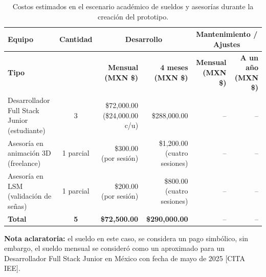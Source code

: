 \begin{table}[H]
	\centering
	\renewcommand{\arraystretch}{1.6}
	\setlength{\tabcolsep}{10pt}
	\Huge
	\begin{adjustbox}{max width=\textwidth}
		\begin{tabular}{|p{5.5cm}|c|r|r|r|r|}
			\hline
			\textbf{Equipo} & \textbf{Cantidad} & \multicolumn{2}{c|}{\textbf{Desarrollo}} & \multicolumn{2}{c|}{\textbf{Mantenimiento / Ajustes}} \\ \hline
			\textbf{Tipo} & & \textbf{Mensual (MXN \$)} & \textbf{4 meses (MXN \$)} & \textbf{Mensual (MXN \$)} & \textbf{A un año (MXN \$)} \\ \hline
			Desarrollador Full Stack Junior (estudiante) & 3 & \$72,000.00 (\$24,000.00 c/u) & \$288,000.00 & -- & -- \\ \hline
			Asesoría en animación 3D (freelance) & 1 parcial & \$300.00 (por sesión) & \$1,200.00 (cuatro sesiones) & -- & -- \\ \hline
			Asesoría en LSM (validación de señas) & 1 parcial & \$200.00 (por sesión) & \$800.00 (cuatro sesiones) & -- & -- \\ \hline
			\textbf{Total} & \textbf{5} & \textbf{\$72,500.00} & \textbf{\$290,000.00} & -- & -- \\ \hline
		\end{tabular}
	\end{adjustbox}
	\caption{Costos estimados en el escenario académico de sueldos y asesorías durante la creación del prototipo.}
	\label{tab:sueldos_asesorias}
\end{table}


\noindent \textbf{Nota aclaratoria:}  
el sueldo en este caso, se considera un pago simbólico, sin embargo, el sueldo mensual se consideró como un aproximado para un Desarrollador Full Stack Junior en México con fecha de mayo de 2025 [CITA IEE].  

